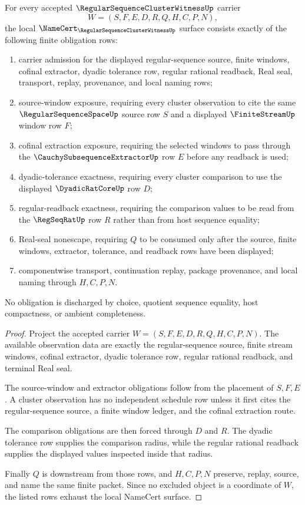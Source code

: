 \begin{theorem}
\label{thm:regular-sequence-cluster-witness-namecert-obligations}
For every accepted $\RegularSequenceClusterWitnessUp$ carrier
$$
W=(S,F,E,D,R,Q,H,C,P,N),
$$
the local $\NameCert_{\RegularSequenceClusterWitnessUp}$ surface consists exactly of the following finite obligation rows:
\begin{enumerate}
\item carrier admission for the displayed regular-sequence source, finite windows, cofinal extractor, dyadic tolerance row, regular rational readback, Real seal, transport, replay, provenance, and local naming rows;
\item source-window exposure, requiring every cluster observation to cite the same $\RegularSequenceSpaceUp$ source row $S$ and a displayed $\FiniteStreamUp$ window row $F$;
\item cofinal extraction exposure, requiring the selected windows to pass through the $\CauchySubsequenceExtractorUp$ row $E$ before any readback is used;
\item dyadic-tolerance exactness, requiring every cluster comparison to use the displayed $\DyadicRatCoreUp$ row $D$;
\item regular-readback exactness, requiring the comparison values to be read from the $\RegSeqRatUp$ row $R$ rather than from host sequence equality;
\item Real-seal nonescape, requiring $Q$ to be consumed only after the source, finite windows, extractor, tolerance, and readback rows have been displayed;
\item componentwise transport, continuation replay, package provenance, and local naming through $H,C,P,N$.
\end{enumerate}
No obligation is discharged by choice, quotient sequence equality, host compactness, or ambient completeness.
\end{theorem}
\begin{proof}
Project the accepted carrier $W=(S,F,E,D,R,Q,H,C,P,N)$. The available observation data are exactly the regular-sequence source, finite stream windows, cofinal extractor, dyadic tolerance row, regular rational readback, and terminal Real seal.

The source-window and extractor obligations follow from the placement of $S,F,E$. A cluster observation has no independent schedule row unless it first cites the regular-sequence source, a finite window ledger, and the cofinal extraction route.

The comparison obligations are then forced through $D$ and $R$. The dyadic tolerance row supplies the comparison radius, while the regular rational readback supplies the displayed values inspected inside that radius.

Finally $Q$ is downstream from those rows, and $H,C,P,N$ preserve, replay, source, and name the same finite packet. Since no excluded object is a coordinate of $W$, the listed rows exhaust the local NameCert surface.
\end{proof}

